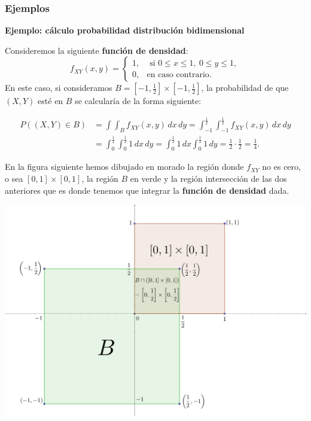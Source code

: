 \documentclass[]{book}
\begin{document}
\hypertarget{ejemplos-3}{%
\subsubsection{Ejemplos}\label{ejemplos-3}}

\textbf{Ejemplo: cálculo probabilidad distribución bidimensional}

Consideremos la siguiente \textbf{función de densidad}:
\[
f_{XY}(x,y)=\begin{cases}
1, & \mbox{ si }0\leq x\leq 1,\ 0\leq y\leq 1, \\
0, & \mbox{en caso contrario.}
\end{cases}
\]
En este caso, si consideramos \(B=\left[-1,\frac{1}{2}\right]\times \left[-1,\frac{1}{2}\right]\), la probabilidad de que \((X,Y)\) esté en \(B\) se calcularía de la forma siguiente:

\[
\begin{array}{rl}
P((X,Y)\in B)&=\int\int_{B} f_{XY}(x,y)\, dx\, dy=\int_{-1}^{\frac{1}{2}}\int_{-1}^{\frac{1}{2}} f_{XY}(x,y)\, dx\, dy \\
&=\int_0^{\frac{1}{2}}\int_0^{\frac{1}{2}} 1\, dx\,dy=\int_0^{\frac{1}{2}} 1\, dx\int_0^{\frac{1}{2}} 1\, dy=\frac{1}{2}\cdot\frac{1}{2}=\frac{1}{4}.
\end{array}
\]

En la figura siguiente hemos dibujado en morado la región donde \(f_{XY}\) no es cero, o sea \([0,1]\times [0,1]\), la región \(B\) en verde y la región intersección de las dos anteriores que es donde tenemos que integrar la \textbf{función de densidad} dada.

\includegraphics{Images/VaUniformeBidi.png}
\end{document}
